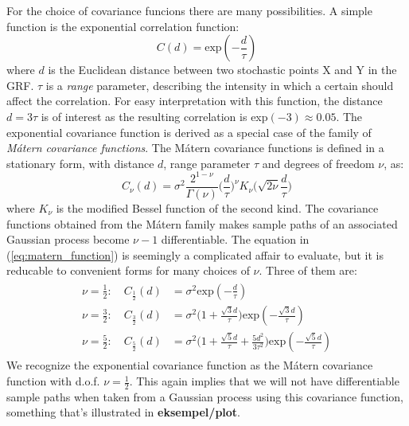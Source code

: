 For the choice of covariance funcions there are many possibilities. A simple function is the exponential correlation function:
\begin{equation*}
C(d) = \text{exp}(-\frac{d}{\tau})
\end{equation*}
where $d$ is the Euclidean distance between two stochastic points X and Y in the GRF. $\tau$ is a \textit{range} parameter, describing the intensity in which a certain should affect the correlation. For easy interpretation with this function, the distance $d = 3\tau$ is of interest as the resulting correlation is exp$(-3) \approx 0.05$.
The exponential covariance function is derived as a special case of the family of \textit{Mátern covariance functions}. The Mátern covariance functions is defined in a stationary form, with distance $d$, range parameter $\tau$ and degrees of freedom $\nu$, as:
\begin{equation}
\label{eq:matern_function}
C_{\nu}(d) = \sigma^2 \frac{2^{1-\nu}}{\Gamma(\nu)}\bigg( \frac{d}{\tau} \bigg)^{\nu} K_{\nu} \bigg( \sqrt{2\nu}\frac{d}{\tau} \bigg)
\end{equation}
where $K_{\nu}$ is the modified Bessel function of the second kind. The covariance functions obtained from the Mátern family makes sample paths of an associated Gaussian process become $\nu - 1$ differentiable. The equation in (\ref{eq:matern_function}) is seemingly a complicated affair to evaluate, but it is reducable to convenient forms for many choices of $\nu$. Three of them are:
\begin{align} \label{eq:covariance_functions}
\begin{split}
\nu = \frac{1}{2}: \quad C_{\frac{1}{2}}(d) &= \sigma^2\text{exp}(-\frac{d}{\tau}) \\
\nu = \frac{3}{2}: \quad C_{\frac{3}{2}}(d) &= \sigma^2 \bigg(1  +
\frac{\sqrt{3}d}{\tau} \bigg) \text{exp}(-\frac{\sqrt{3}d}{\tau}) \\
\nu = \frac{5}{2}: \quad C_{\frac{5}{2}}(d) &= \sigma^2 \bigg(1  +
\frac{\sqrt{5}d}{\tau} + \frac{5d^2}{3\tau^2}\bigg) \text{exp}(-\frac{\sqrt{5}d}{\tau})
\end{split}
\end{align}
We recognize the exponential covariance function as the Mátern covariance function with d.o.f. $\nu = \frac{1}{2}$. This again implies that we will not have differentiable sample paths when taken from a Gaussian process using this covariance function, something that's illustrated in \textbf{eksempel/plot}.  


